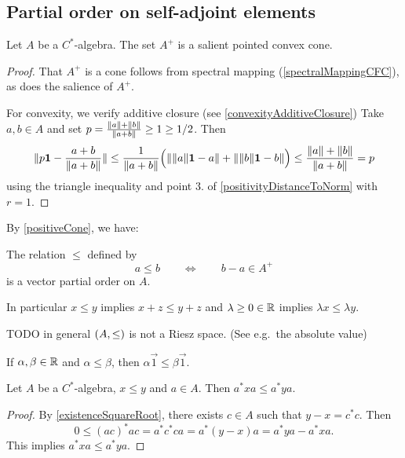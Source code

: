 \subsection{Partial order on self-adjoint elements}
\begin{proposition}
Let $A$ be a $C^*$-algebra. The set $A^+$ is a salient pointed convex cone.
\end{proposition}
\begin{proof}
That $A^+$ is a cone follows from spectral mapping (\ref{spectralMappingCFC}), as does the salience of $A^+$.

For convexity, we verify additive closure (see \ref{convexityAdditiveClosure}) Take $a,b\in A$ and set $p= \frac{\lVert a\rVert+\lVert b\rVert}{\lVert a+b\rVert} \geq 1 \geq 1/2$. Then
\[ \lVert p\boldsymbol{\mathrm{1}} - \frac{a+b}{\lVert a+b\rVert}\rVert \leq \frac{1}{\lVert a+b\rVert}\Big(\lVert\big.\lVert a\rVert\boldsymbol{\mathrm{1}}-a\rVert + \lVert\big.\lVert b\rVert\boldsymbol{\mathrm{1}}-b\rVert\Big) \leq \frac{\lVert a\rVert+\lVert b\rVert}{\lVert a+b\rVert} = p \]
using the triangle inequality and point 3. of \ref{positivityDistanceToNorm} with $r=1$.
\end{proof}
By \ref{positiveCone}, we have:
\begin{corollary} \label{C*PositivityVectorOrder}
The relation $\leq$ defined by
\[ a\leq b \qquad\iff\qquad b-a\in A^+ \]
is a vector partial order on $A$.
\end{corollary}
In particular $x\leq y$ implies $x+z \leq y+z$ and $\lambda \geq 0\in \mathbb{R}$ implies $\lambda x \leq \lambda y$.

TODO in general $\sSet{A, \leq}$ is not a Riesz space. (See e.g.\ the absolute value)

\begin{lemma}
If $\alpha,\beta\in\mathbb{R}$ and $\alpha\leq \beta$, then $\alpha\vec{1}\leq \beta\vec{1}$.
\end{lemma}


\begin{lemma} \label{CstarOrderLemma}
Let $A$ be a $C^*$-algebra, $x\leq y$ and $a\in A$. Then $a^*xa \leq a^*ya$.
\end{lemma}
\begin{proof}
By \ref{existenceSquareRoot}, there exists $c\in A$ such that $y-x = c^*c$. Then
\[ 0 \leq (ac)^*ac = a^*c^*ca = a^*(y-x)a = a^*ya - a^*xa. \]
This implies $a^*xa \leq a^*ya$.
\end{proof}

